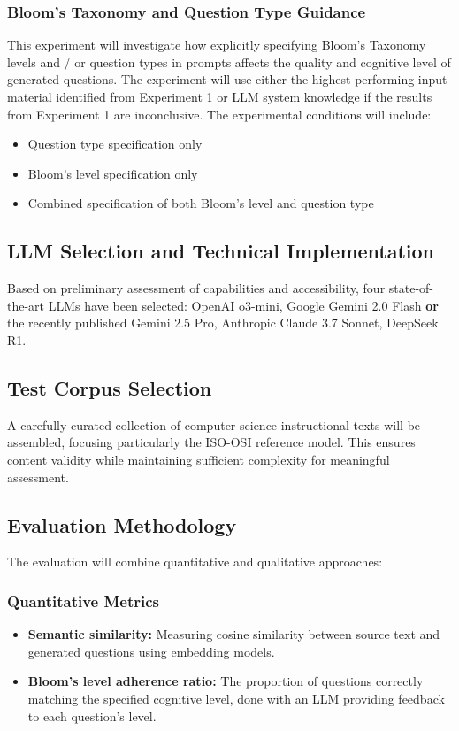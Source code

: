 \documentclass[12pt]{article}
\begin{document}
\subsubsection{Bloom's Taxonomy and Question Type Guidance}
This experiment will investigate how explicitly specifying Bloom's Taxonomy levels and / or question types in prompts affects the quality and cognitive level of generated questions. The experiment will use either the highest-performing input material identified from Experiment 1 or LLM system knowledge if the results from Experiment 1 are inconclusive. The experimental conditions will include:
\begin{itemize}
    \item Question type specification only
    \item Bloom's level specification only
    \item Combined specification of both Bloom's level and question type
\end{itemize}

\subsection{LLM Selection and Technical Implementation}
Based on preliminary assessment of capabilities and accessibility, four state-of-the-art LLMs have been selected: OpenAI o3-mini, Google Gemini 2.0 Flash \textbf{or} the recently published Gemini 2.5 Pro, Anthropic Claude 3.7 Sonnet, DeepSeek R1.

\subsection{Test Corpus Selection}
A carefully curated collection of computer science instructional texts will be assembled, focusing particularly the ISO-OSI reference model. This ensures content validity while maintaining sufficient complexity for meaningful assessment.

\subsection{Evaluation Methodology}
The evaluation will combine quantitative and qualitative approaches:

\subsubsection{Quantitative Metrics}
\begin{itemize}
    \item \textbf{Semantic similarity:} Measuring cosine similarity between source text and generated questions using embedding models.
    \item \textbf{Bloom's level adherence ratio:} The proportion of questions correctly matching the specified cognitive level, done with an LLM providing feedback to each question's level.
\end{itemize}
\end{document}
